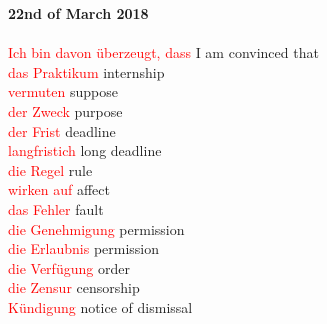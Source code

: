 \documentclass{article}
\begin{document}
	\textbf{22nd of March 2018}\\\\
	\textcolor{red}{Ich bin davon überzeugt, dass} I am convinced that\\
	\textcolor{red}{das Praktikum} internship\\
	\textcolor{red}{vermuten} suppose\\
	\textcolor{red}{der Zweck} purpose\\
	\textcolor{red}{der Frist} deadline\\
	\textcolor{red}{langfristich} long deadline\\
	\textcolor{red}{die Regel} rule\\
	\textcolor{red}{wirken auf} affect\\
	\textcolor{red}{das Fehler} fault\\
	\textcolor{red}{die Genehmigung} permission\\
	\textcolor{red}{die Erlaubnis} permission\\
	\textcolor{red}{die Verfügung} order\\
	\textcolor{red}{die Zensur} censorship\\
	\textcolor{red}{Kündigung} notice of dismissal\\
	
	
	
	
	
	\clearpage
	
	\printglossaries
	
\end{document}
